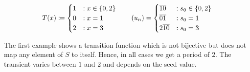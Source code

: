 \documentclass{stdlocal}
\begin{document}
    \hfill
    \begin{minipage}{0.73\textwidth}
      \[
        T(x) \define
        \begin{cases}
          1 &: x \in \set{0,2}{} \\
          0 &: x = 1 \\
          2 &: x = 3
        \end{cases}
        \separate
        (u_n) =
        \begin{cases}
          \overline{10} &: s_0 \in \set{0,2}{} \\
          \overline{01} &: s_0 = 1 \\
          2\overline{10} &: s_0 = 3
        \end{cases}
      \]
    \end{minipage}
    \medskip
    \par
    \noindent
    The first example shows a transition function which is not bijective but does not map any element of $S$ to itself.
    Hence, in all cases we get a period of $2$.
    The transient varies between $1$ and $2$ and depends on the seed value.
\end{document}
